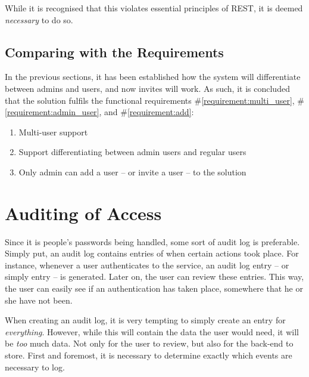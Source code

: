 			While it is recognised that this violates essential principles of REST, it is deemed \emph{necessary} to do so.


		\subsection{Comparing with the Requirements}
			\label{requirement:fulfilled:multi_user}
			\label{requirement:fulfilled:admin_user}
			\label{requirement:fulfilled:add}
			In the previous sections, it has been established how the system will differentiate between admins and users, and now invites will work. As such, it is concluded that the solution fulfils the functional requirements \#\ref{requirement:multi_user}, \#\ref{requirement:admin_user}, and \#\ref{requirement:add}:

			\vspace{-3ex}\begin{enumerate}
				\setlength\itemsep{0.1em}
				\setcounter{enumi}{2-1}
				\item Multi-user support
				\item Support differentiating between admin users and regular users
				\setcounter{enumi}{6-1}
				\item Only admin can add a user -- or invite a user -- to the solution
			\end{enumerate}

	\section{Auditing of Access}
		\label{sec:audit}
		Since it is people's passwords being handled, some sort of audit log is preferable. Simply put, an audit log contains entries of when certain actions took place. For instance, whenever a user authenticates to the service, an audit log entry -- or simply entry -- is generated. Later on, the user can review these entries. This way, the user can easily see if an authentication has taken place, somewhere that he or she have not been.

		When creating an audit log, it is very tempting to simply create an entry for \emph{everything}. However, while this will contain the data the user would need, it will be \emph{too} much data. Not only for the user to review, but also for the back-end to store. First and foremost, it is necessary to determine exactly which events are necessary to log.

